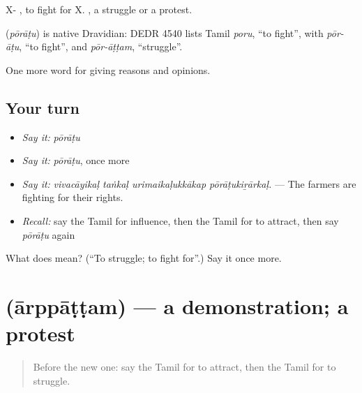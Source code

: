 X- , to fight for X. , a struggle or a protest.

\begin{cousinweb}
\textbf{} (\emph{pōrāṭu}) is native Dravidian: DEDR 4540 lists Tamil \emph{poru}, \textquotedblleft{}to fight\textquotedblright{}, with \emph{pōr-āṭu}, \textquotedblleft{}to fight\textquotedblright{}, and \emph{pōr-āṭṭam}, \textquotedblleft{}struggle\textquotedblright{}.
\end{cousinweb}

\begin{grammarlens}[title={What you've built}]
One more word for giving reasons and opinions.
\end{grammarlens}

\subsection*{Your turn}
\begin{itemize}
\raggedright
  \item \emph{Say it:} \emph{pōrāṭu}
  \item \emph{Say it:} \emph{pōrāṭu}, once more
  \item \emph{Say it:} \emph{vivacāyikaḷ taṅkaḷ urimaikaḷukkākap pōrāṭukiṟārkaḷ.} — The farmers are fighting for their rights.
  \item \emph{Recall:} say the Tamil for influence, then the Tamil for to attract, then say \emph{pōrāṭu} again
\end{itemize}

\begin{tcolorbox}[breakable,colback=teal!4,colframe=teal!35!black,title={Before you move on}]
What does  mean? (\textquotedblleft{}To struggle; to fight for\textquotedblright{}.) Say it once more.
\end{tcolorbox}
\section[\texorpdfstring{\ta{ஆர்ப்பாட்டம்} (ārppāṭṭam)}{ஆர்ப்பாட்டம் (ārppāṭṭam)}]{ (ārppāṭṭam) — a demonstration; a protest}

\label{lesson:TA-C376-arppattam}



\begin{quote}
Before the new one: say the Tamil for to attract, then the Tamil for to struggle.
\end{quote}

